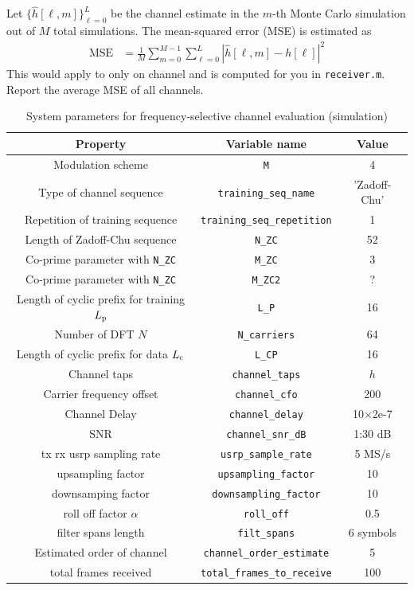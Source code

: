 \documentclass{book}
\begin{document}
Let $\{ \hat{h}[\ell,m] \}_{\ell=0}^L$ be the channel estimate in the $m$-th Monte Carlo simulation out of $M$ total simulations. The mean-squared error (MSE) is estimated as 
\begin{align}
\mathrm{MSE} & = \frac{1}{M} \sum_{m=0}^{M-1} \sum_{\ell=0}^L |  \hat{h}[\ell,m]  - h[\ell]|^2
\end{align}
This would apply to only on channel and is computed for you in \verb|receiver.m|. Report the average MSE of all channels. 
\begin{table}[h!]
	\caption{System parameters for frequency-selective channel evaluation (simulation)}
	\begin{center}
		\begin{tabular}{|c|c|c|} \hline
			Property & Variable name &Value  \\ \hline	
			Modulation scheme & \verb|M| & 4 \\ \hline
			Type of channel sequence & \verb|training_seq_name| & 'Zadoff-Chu' \\ \hline
			Repetition of training sequence & \verb|training_seq_repetition| & 1 \\ \hline
			Length of Zadoff-Chu sequence & \verb|N_ZC| & 52 \\ \hline
			Co-prime parameter with \verb|N_ZC| & \verb|M_ZC| & 3 \\ \hline
			Co-prime parameter with \verb|N_ZC| & \verb|M_ZC2| & ? \\ \hline
			Length of cyclic prefix for training ${L_\mathrm{p}}$ & \verb|L_P| & 16 \\ \hline
			Number of DFT $N$ & \verb|N_carriers| & 64 \\ \hline
			Length of cyclic prefix for data ${L_\mathrm{c}}$ & \verb|L_CP| & 16 \\ \hline			
			Channel taps & \verb|channel_taps| & $h$\\ \hline
			Carrier frequency offset & \verb|channel_cfo| & 200 \\ \hline
			Channel Delay & \verb|channel_delay| & 10$\times$2e-7 \\ \hline
			SNR & \verb|channel_snr_dB| & 1:30 dB\\ \hline
			tx rx usrp sampling rate & \verb|usrp_sample_rate| & 5 MS/s \\ \hline
			upsampling factor &  \verb|upsampling_factor| & 10   \\ \hline 
			downsamping factor &  \verb|downsampling_factor| & 10   \\ \hline 
			roll off factor $\alpha$  & \verb|roll_off| & 0.5 \\ \hline
			filter spans length & \verb|filt_spans| & 6 symbols\\ \hline
			Estimated order of channel & \verb|channel_order_estimate| & 5 \\ \hline
			total frames received & \verb|total_frames_to_receive| & 100\\ \hline
		\end{tabular}
	\end{center} \label{sc_tab_sys_par_simulation}
\end{table}
\end{document}
